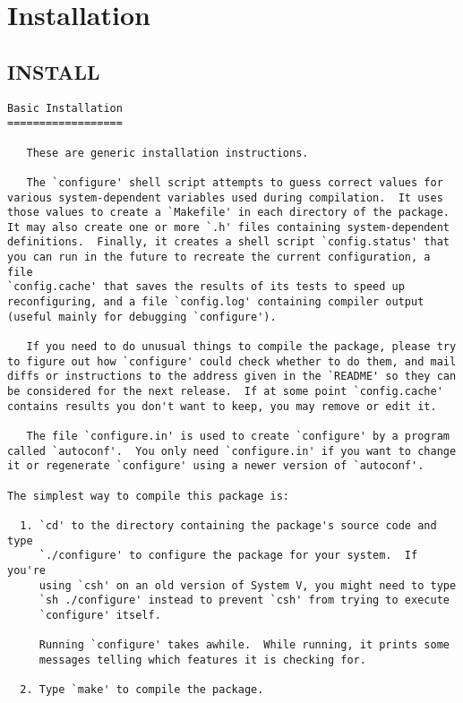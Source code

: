 \section{Installation}
\label{group__installation}
\subsection{INSTALL}\label{install}


\footnotesize\begin{verbatim}Basic Installation
==================

   These are generic installation instructions.

   The `configure' shell script attempts to guess correct values for
various system-dependent variables used during compilation.  It uses
those values to create a `Makefile' in each directory of the package.
It may also create one or more `.h' files containing system-dependent
definitions.  Finally, it creates a shell script `config.status' that
you can run in the future to recreate the current configuration, a file
`config.cache' that saves the results of its tests to speed up
reconfiguring, and a file `config.log' containing compiler output
(useful mainly for debugging `configure').

   If you need to do unusual things to compile the package, please try
to figure out how `configure' could check whether to do them, and mail
diffs or instructions to the address given in the `README' so they can
be considered for the next release.  If at some point `config.cache'
contains results you don't want to keep, you may remove or edit it.

   The file `configure.in' is used to create `configure' by a program
called `autoconf'.  You only need `configure.in' if you want to change
it or regenerate `configure' using a newer version of `autoconf'.

The simplest way to compile this package is:

  1. `cd' to the directory containing the package's source code and type
     `./configure' to configure the package for your system.  If you're
     using `csh' on an old version of System V, you might need to type
     `sh ./configure' instead to prevent `csh' from trying to execute
     `configure' itself.

     Running `configure' takes awhile.  While running, it prints some
     messages telling which features it is checking for.

  2. Type `make' to compile the package.


\end{verbatim}
